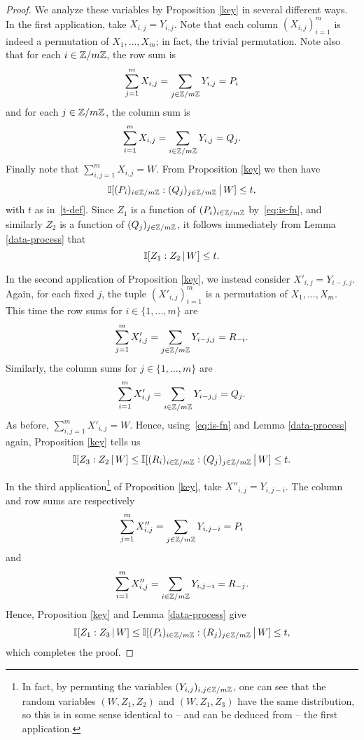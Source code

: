 \begin{proof}
  We analyze these variables by Proposition \ref{key} in several different ways.
  In the first application, take $X_{i,j}=Y_{i,j}$.
  Note that each column $(X_{i,j})_{i=1}^m$ is indeed a permutation of $X_1,\dots,X_m$; in fact, the trivial permutation.
  Note also that for each $i \in \mathbb{Z}/m\mathbb{Z}$, the row sum is
  \[
    \sum_{j=1}^m X_{i,j} = \sum_{j \in \mathbb{Z}/m\mathbb{Z}} Y_{i,j} = P_i
  \]
  and for each $j \in \mathbb{Z}/m\mathbb{Z}$, the column sum is
  \[
    \sum_{i=1}^m X_{i,j} = \sum_{i \in \mathbb{Z}/m\mathbb{Z}} Y_{i,j} = Q_j.
  \]
  Finally note that $\sum_{i,j=1}^m X_{i,j} = W$.
  From Proposition \ref{key} we then have
  \[
    \mathbb{I}[ (P_i)_{i \in \mathbb{Z}/m\mathbb{Z}} : (Q_j)_{j \in \mathbb{Z}/m\mathbb{Z} } \,\big|\, W ] \leq t,
  \]
  with $t$ as in~\eqref{t-def}.
  Since $Z_1$ is a function of $(P_i)_{i \in \mathbb{Z}/m\mathbb{Z}}$ by~\eqref{eq:is-fn}, and similarly $Z_2$ is a function of $(Q_j)_{j \in \mathbb{Z}/m\mathbb{Z}}$, it follows immediately from Lemma \ref{data-process} that
  \[
    \mathbb{I}[ Z_1 : Z_2 \,|\, W ] \leq t.
  \]

  In the second application of Proposition \ref{key}, we instead consider $X'_{i,j} = Y_{i-j,j}$.
  Again, for each fixed $j$, the tuple $(X'_{i,j})_{i=1}^m$ is a permutation of $X_1,\dots,X_m$.
  This time the row sums for $i \in \{1,\dots, m\}$ are
  \[
    \sum_{j=1}^m X'_{i,j} = \sum_{j \in \mathbb{Z}/m\mathbb{Z}} Y_{i-j,j} = R_{-i}.
  \]
 Similarly, the column sums for $j \in \{1,\dots, m\}$ are
  \[
    \sum_{i=1}^m X'_{i,j} = \sum_{i \in \mathbb{Z}/m\mathbb{Z}} Y_{i-j,j} = Q_j.
  \]
  As before, $\sum_{i,j=1}^m X'_{i,j} = W$.
  Hence, using~\eqref{eq:is-fn} and Lemma \ref{data-process} again, Proposition \ref{key} tells us
  \[
    \mathbb{I}[ Z_3 :  Z_2 \,|\, W] \leq \mathbb{I}[ (R_i)_{i \in \mathbb{Z}/m\mathbb{Z}} : (Q_j)_{j \in \mathbb{Z}/m\mathbb{Z} } \,\big|\, W ] \leq t.
  \]

  In the third application\footnote{In fact, by permuting the variables $(Y_{i,j})_{i,j \in \mathbb{Z}/m\mathbb{Z}}$, one can see that the random variables $(W, Z_1, Z_2)$ and $(W, Z_1, Z_3)$ have the same distribution, so this is in some sense identical to -- and can be deduced from -- the first application.} of Proposition \ref{key}, take $X''_{i,j} = Y_{i,j-i}$.
  The column and row sums are respectively
  \[
    \sum_{j=1}^m X''_{i,j} = \sum_{j \in \mathbb{Z}/m\mathbb{Z}} Y_{i,j-i} = P_i \] and
\[     \sum_{i=1}^m X''_{i,j} = \sum_{i \in \mathbb{Z}/m\mathbb{Z}} Y_{i,j-i} = R_{-j}.
  \]
  Hence, Proposition \ref{key} and Lemma \ref{data-process} give
  \[
    \mathbb{I}[ Z_1 : Z_3 \,|\, W] \leq \mathbb{I}[ (P_i)_{i \in \mathbb{Z}/m\mathbb{Z}} : (R_j)_{j \in \mathbb{Z}/m\mathbb{Z} } \,\big|\, W ] \leq t,
  \]
  which completes the proof.
\end{proof}

